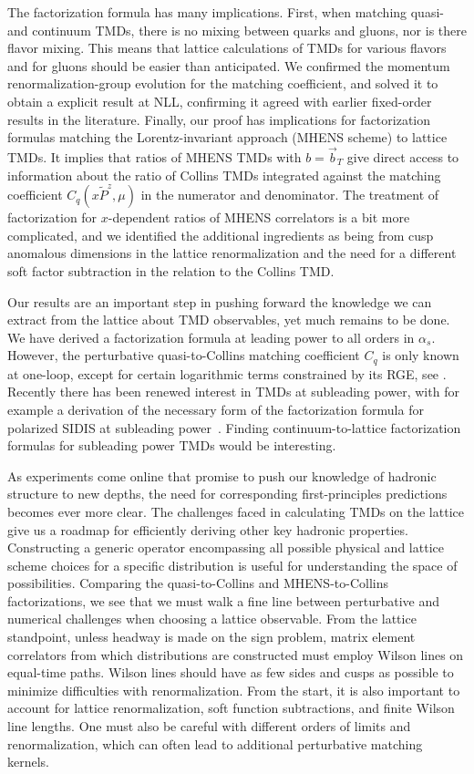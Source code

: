 \documentclass[11pt,a4paper]{article}
\begin{document}
The factorization formula has many implications. 
First, when matching quasi- and continuum TMDs, there is no mixing between quarks and gluons, nor is there flavor mixing. 
This means that lattice calculations of TMDs for various flavors and for gluons should be easier than anticipated. 
We confirmed the momentum renormalization-group evolution for the matching coefficient, and solved it to obtain a explicit result at NLL, confirming it agreed with earlier fixed-order results in the literature. 
Finally, our proof has implications for factorization formulas matching the Lorentz-invariant approach (MHENS scheme) to lattice TMDs. It implies that ratios of MHENS TMDs with $b=\vec b_T$ give direct access to information about the ratio of Collins TMDs integrated against the matching coefficient $C_q(x\tilde P^z,\mu)$ in the numerator and denominator. The treatment of factorization for $x$-dependent ratios of MHENS correlators is a bit more complicated, and we identified the additional ingredients as being from cusp anomalous dimensions in the lattice renormalization and the need for a different soft factor subtraction in the relation to the Collins TMD.

Our results are an important step in pushing forward the knowledge we can extract from the lattice about TMD observables, yet much remains to be done. We have derived a factorization formula at leading power to all orders in $\alpha_s$. However, the perturbative quasi-to-Collins matching coefficient $C_q$ is only known at one-loop, except for certain logarithmic terms constrained by its RGE, see . Recently there has been renewed interest in TMDs at subleading power, with for example a derivation of the necessary form of the factorization formula for polarized SIDIS at subleading power~\cite{Vladimirov:2021hdn, Ebert:2021jhy}. Finding continuum-to-lattice factorization formulas for subleading power TMDs would be interesting.
	
As experiments come online that promise to push our knowledge of hadronic structure to new depths, the need for corresponding first-principles predictions becomes ever more clear. The challenges faced in calculating TMDs on the lattice give us a roadmap for efficiently deriving other key hadronic properties. Constructing a generic operator encompassing all possible physical and lattice scheme choices for a specific distribution is useful for understanding the space of possibilities. 
Comparing the quasi-to-Collins and MHENS-to-Collins factorizations, we see that we must walk a fine line between perturbative and numerical challenges when choosing a lattice observable. From the lattice standpoint, unless  headway is made on the sign problem, matrix element correlators from which distributions are constructed must employ Wilson lines on equal-time paths. Wilson lines should have as few sides and cusps as possible to minimize difficulties with renormalization.  From the start, it is also important to account for lattice renormalization, soft function subtractions, and finite Wilson line lengths. 
One must also be careful with different orders of limits and renormalization, which can often lead to additional perturbative matching kernels.  
\end{document}

